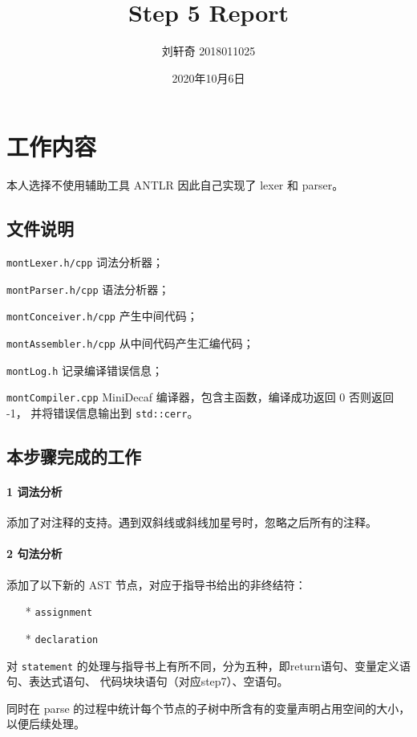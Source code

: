 \documentclass[UTF8]{ctexart}
\title{Step 5 Report}
\author{刘轩奇 2018011025}
\date{2020年10月6日}
\newcommand{\T}[1]{\texttt{{#1}}}
\begin{document}
    \maketitle
    \section{工作内容}
        本人选择不使用辅助工具 ANTLR 因此自己实现了 lexer 和 parser。
        \subsection{文件说明} 
            \T{montLexer.h/cpp} 词法分析器；

            \T{montParser.h/cpp} 语法分析器；

            \T{montConceiver.h/cpp} 产生中间代码；

            \T{montAssembler.h/cpp} 从中间代码产生汇编代码；
            
            \T{montLog.h} 记录编译错误信息；

            \T{montCompiler.cpp} MiniDecaf 编译器，包含主函数，编译成功返回 0 否则返回 -1，
            并将错误信息输出到 \T{std::cerr}。
        
        \subsection{本步骤完成的工作}

            \paragraph{1 词法分析} 添加了对注释的支持。遇到双斜线或斜线加星号时，忽略之后所有的注释。

            \paragraph{2 句法分析} 添加了以下新的 AST 节点，对应于指导书给出的非终结符：
            \begin{itemize}
                \item[*] \T{assignment}
                \item[*] \T{declaration} 
            \end{itemize}

            对 \T{statement} 的处理与指导书上有所不同，分为五种，即return语句、变量定义语句、表达式语句、
            代码块块语句（对应step7）、空语句。

            同时在 parse 的过程中统计每个节点的子树中所含有的变量声明占用空间的大小，以便后续处理。
\end{document}

